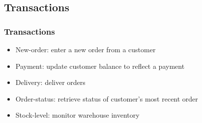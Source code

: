 \documentclass[12pt]{beamer}
\begin{document}
\subsection{Transactions}
\begin{frame}[c]
\frametitle{Transactions}
\begin{itemize}
 \item New-order: enter a new order from a customer
 \item Payment: update customer balance to reflect a payment
 \item Delivery: deliver orders
 \item Order-status: retrieve status of customer’s most recent order
 \item Stock-level: monitor warehouse inventory
 
\end{itemize}

\end{frame}

\end{document}
